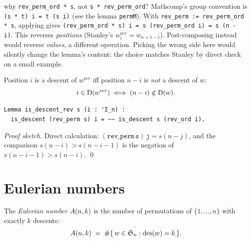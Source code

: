 \begin{sidebar}{why \texttt{rev\_perm\_ord * s}, not \texttt{s * rev\_perm\_ord}?}
Mathcomp's group convention is \texttt{(s * t) i = t (s i)} (see
the lemma \texttt{permM}). With \texttt{rev\_perm := rev\_perm\_ord * s},
applying gives \texttt{(rev\_perm\_ord * s) i = s (rev\_perm\_ord i)
= s (n - i)}. This reverses \emph{positions} (Stanley's
$w^{\mathrm{rev}}_i = w_{n+1-i}$). Post-composing instead would
reverse \emph{values}, a different operation. Picking the wrong
side here would silently change the lemma's content; the choice
matches Stanley by direct check on a small example.
\end{sidebar}

\begin{lemma}
  \label{lem:is_descent_rev}
  Position $i$ is a descent of $w^{\mathrm{rev}}$ iff position $n - i$
  is \emph{not} a descent of $w$:
  \[
    i \in \mathrm{D}(w^{\mathrm{rev}})
    \iff
    (n - i) \notin \mathrm{D}(w).
  \]
\end{lemma}

\begin{lstlisting}[language=Rocq]
Lemma is_descent_rev s (i : 'I_n) :
  is_descent (rev_perm s) i = ~~ is_descent s (rev_ord i).
\end{lstlisting}


\noindent
\emph{Proof sketch.} Direct calculation: $\mathtt{(rev\_perm\,s)\,j} =
s(n-j)$, and the comparison $s(n-i) > s(n-i-1)$ is the negation of
$s(n-i-1) > s(n-i)$. \qed

\section{Eulerian numbers}
\label{sec:eulerian}

\begin{definition}
  \label{def:eulerian}
  The \emph{Eulerian number} $A(n, k)$ is the number of
  permutations of $\{1, \dots, n\}$ with exactly $k$ descents:
  \[
    A(n, k) \;=\; \#\{\, w \in \mathfrak{S}_{n} : \mathrm{des}(w) = k \,\}.
  \]
\end{definition}

